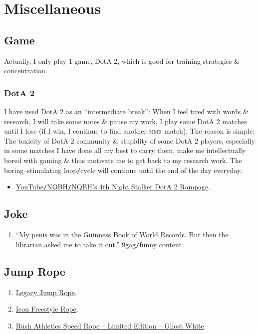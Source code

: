 \documentclass[oneside]{book}
\numberwithin{equation}{section}
\begin{document}
\chapter{Miscellaneous}

\section{Game}
Actually, I only play 1 game, DotA 2, which is good for training strategies \& concentration.

\subsection{DotA 2}
I have used DotA 2 as an ``intermediate break'': When I feel tired with words \& research, I will take some notes \& pause my work, I play some DotA 2 matches until I lose (if I win, I continue to find another \textsc{mmr} match). The reason is simple: The toxicity of DotA 2 community \& stupidity of some DotA 2 players, especially in some matches I have done all my best to carry them, make me intellectually bored with gaming \& thus motivate me to get back to my research work. The boring--stimulating loop\texttt{/}cycle will continue until the end of the day everyday.

\begin{itemize}
	\item \href{https://www.youtube.com/watch?v=d9vmHp-4f3k}{YouTube\texttt{/}NQBH\texttt{/}NQBH's 4th Night Stalker DotA 2 Rampage}.
\end{itemize}

\section{Joke}

\begin{enumerate}
	\item ``My penis was in the Guinness Book of World Records. But then the librarian asked me to take it out.'' \href{https://9gag.com/gag/aPZPm6q}{9gag\texttt{/}funny content}
\end{enumerate}

\section{Jump Rope}

\begin{enumerate}
	\item \href{https://www.rushathletics.co.uk/collections/ropes/products/legacy-jump-rope}{Legacy Jump Rope}.
	\item \href{https://www.rushathletics.co.uk/collections/ropes/products/icon-freestyle-rope}{Icon Freestyle Rope}.
	\item \href{https://www.rushathletics.co.uk/collections/ropes/products/rush-athletics-speed-rope-ghost-white}{Rush Athletics Speed Rope -- Limited Edition -- Ghost White}.
\end{enumerate}
\end{document}

